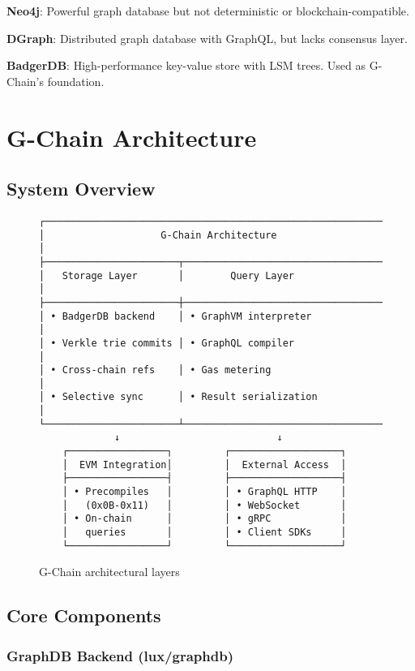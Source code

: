 \documentclass[11pt,a4paper]{article}
\begin{document}
\textbf{Neo4j}: Powerful graph database but not deterministic or blockchain-compatible.

\textbf{DGraph}: Distributed graph database with GraphQL, but lacks consensus layer.

\textbf{BadgerDB}: High-performance key-value store with LSM trees. Used as G-Chain's foundation.

\section{G-Chain Architecture}

\subsection{System Overview}

\begin{figure}[h]
\centering
\begin{verbatim}
┌──────────────────────────────────────────────────────────────┐
│                    G-Chain Architecture                       │
├───────────────────────┬──────────────────────────────────────┤
│   Storage Layer       │        Query Layer                   │
├───────────────────────┼──────────────────────────────────────┤
│ • BadgerDB backend    │ • GraphVM interpreter                │
│ • Verkle trie commits │ • GraphQL compiler                   │
│ • Cross-chain refs    │ • Gas metering                       │
│ • Selective sync      │ • Result serialization               │
└───────────────────────┴──────────────────────────────────────┘
             ↓                           ↓
    ┌─────────────────┐         ┌───────────────────┐
    │  EVM Integration│         │  External Access  │
    ├─────────────────┤         ├───────────────────┤
    │ • Precompiles   │         │ • GraphQL HTTP    │
    │   (0x0B-0x11)   │         │ • WebSocket       │
    │ • On-chain      │         │ • gRPC            │
    │   queries       │         │ • Client SDKs     │
    └─────────────────┘         └───────────────────┘
\end{verbatim}
\caption{G-Chain architectural layers}
\end{figure}

\subsection{Core Components}

\subsubsection{GraphDB Backend (lux/graphdb)}
\end{document}
